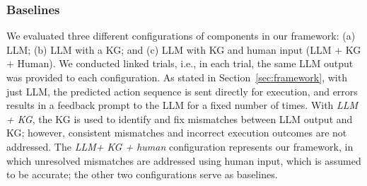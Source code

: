 \subsubsection{Baselines}
We evaluated three different configurations of components in our framework: (a) LLM; (b) LLM with a KG; and (c) LLM with KG and human input (LLM + KG + Human). We conducted linked trials, i.e., in each trial, the same LLM output was provided to each configuration. %
As stated in Section~\ref{sec:framework}, with just LLM, the predicted action sequence is sent directly for execution, and errors results in a feedback prompt to the LLM for a fixed number of times. %
With \textit{LLM + KG}, the KG is used to identify and fix mismatches between LLM output and KG; however, consistent mismatches and incorrect execution outcomes are not addressed. The \textit{LLM+ KG + human} configuration represents our framework, in which unresolved mismatches are addressed using human input, which is assumed to be accurate; the other two configurations serve as baselines.



